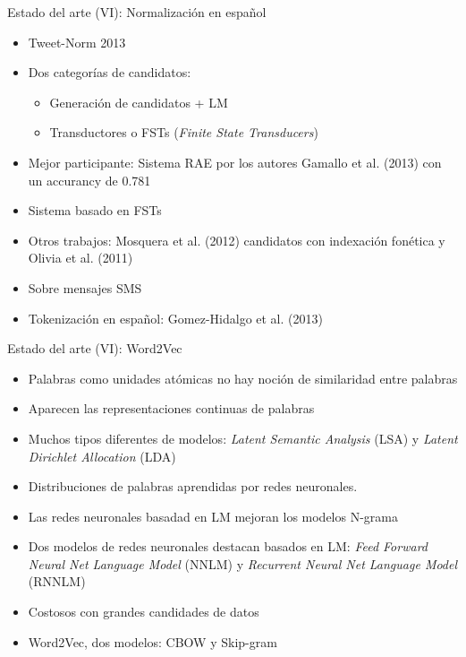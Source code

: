 \begin{tframe}{Estado del arte (VI): Normalizaci\'on en espa\~nol}
	\begin{itemize}
		\item Tweet-Norm 2013
		\item Dos categorías de candidatos:
			\begin{itemize}
				\item Generaci\'on de candidatos + LM
				\item Transductores o FSTs (\textit{Finite State Transducers})
			\end{itemize}
		\item Mejor participante: Sistema RAE por los autores Gamallo et al. (2013) con un accurancy de 0.781
		\item Sistema basado en FSTs
		\item Otros trabajos: Mosquera et al. (2012) candidatos con indexaci\'on fon\'etica y Olivia et al. (2011)
		\item Sobre mensajes SMS
		\item Tokenizaci\'on en espa\~nol: Gomez-Hidalgo et al. (2013)
	\end{itemize}
\end{tframe}

\begin{tframe}{Estado del arte (VI): Word2Vec}
	\begin{itemize}
		\item Palabras como unidades at\'omicas no hay noci\'on de similaridad entre palabras
		\item Aparecen las representaciones continuas de palabras
		\item Muchos tipos diferentes de modelos: \textit{Latent Semantic Analysis} (LSA) y \textit{Latent Dirichlet Allocation} (LDA)
		\item Distribuciones de palabras aprendidas por redes neuronales.
		\item Las redes neuronales basadad en LM mejoran los modelos N-grama
		\item Dos modelos de redes neuronales destacan basados en LM: \textit{Feed Forward Neural Net Language Model} (NNLM) y \textit{Recurrent Neural Net Language Model} (RNNLM)
		\item<+-> Costosos con grandes candidades de datos
		\item<+-| alert@+> Word2Vec, dos modelos: CBOW y Skip-gram
	\end{itemize}
\end{tframe}

